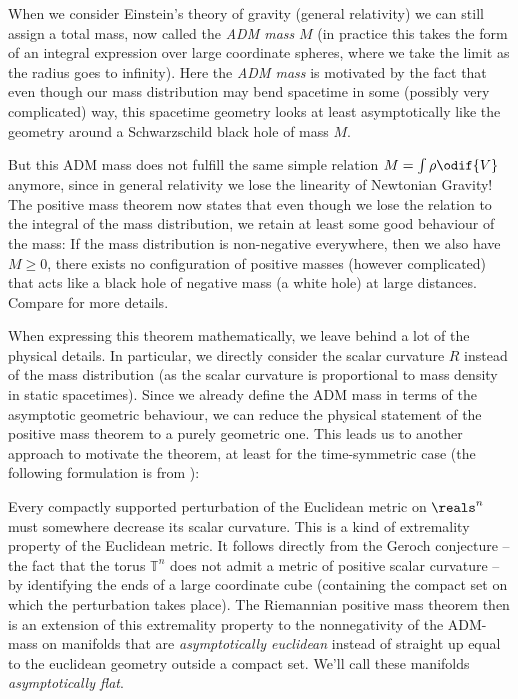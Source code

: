 \documentclass[titlepage,numbers=noenddot,oneside,%
cleardoublepage=empty,paper=a4,fontsize=11pt,%
english,%
]{scrartcl}
\begin{document}
When we consider Einstein's theory of gravity (\ie general relativity) we can still assign a total mass, now called the \emph{ADM mass} \( M \) (in practice this takes the form of an integral expression over large coordinate spheres, where we take the limit as the radius goes to infinity). Here the \emph{ADM mass} is motivated by the fact that even though our mass distribution may bend spacetime in some (possibly very complicated) way, this spacetime geometry looks at least asymptotically like the geometry around a Schwarzschild black hole of mass \( M \).

But this ADM mass does not fulfill the same simple relation \( M=\int \rho\odif{V} \) anymore, since in general relativity we lose the linearity of Newtonian Gravity! The positive mass theorem now states that even though we lose the relation to the integral of the mass distribution, we retain at least some good behaviour of the mass: If the mass distribution is non-negative everywhere, then we also have \( M\geq 0 \), \ie there exists no configuration of positive masses (however complicated) that acts like a black hole of negative mass (a white hole) at large distances. Compare \cite[Chapter 7]{leeGeometricRelativity2019} for more details.

When expressing this theorem mathematically, we leave behind a lot of the physical details. In particular, we directly consider the scalar curvature \( R \) instead of the mass distribution (as the scalar curvature is proportional to mass density in static spacetimes). Since we already define the ADM mass in terms of the asymptotic geometric behaviour, we can reduce the physical statement of the positive mass theorem to a purely geometric one. This leads us to another approach to motivate the theorem, at least for the time-symmetric case (the following formulation is from \cite[1]{braySpacetimeHarmonicFunctions2021}):

Every compactly supported perturbation of the Euclidean metric on \( \reals^n \) must somewhere decrease its scalar curvature. This is a kind of extremality property of the Euclidean metric. It follows directly from the Geroch conjecture -- the fact that the torus \( \mathbb{T}^n \) does not admit a metric of positive scalar curvature -- by identifying the ends of a large coordinate cube (containing the compact set on which the perturbation takes place). The Riemannian positive mass theorem then is an extension of this extremality property to the nonnegativity of the ADM-mass on manifolds that are \emph{asymptotically euclidean} instead of straight up equal to the euclidean geometry outside a compact set. We'll call these manifolds \emph{asymptotically flat}.
\end{document}

